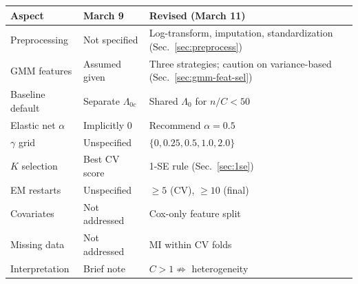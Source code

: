 \documentclass[11pt]{article}
\begin{document}
\begin{center}\small
\begin{tabular}{p{3cm}p{5cm}p{5.5cm}}
\toprule
\textbf{Aspect} & \textbf{March 9} & \textbf{Revised (March 11)} \\
\midrule
Preprocessing & Not specified & Log-transform, imputation, standardization (Sec.~\ref{sec:preprocess}) \\[3pt]
GMM features & Assumed given & Three strategies; caution on variance-based (Sec.~\ref{sec:gmm-feat-sel}) \\[3pt]
Baseline default & Separate $\Lambda_{0c}$ & Shared $\Lambda_0$ for $n/C<50$ \\[3pt]
Elastic net $\alpha$ & Implicitly 0 & Recommend $\alpha=0.5$ \\[3pt]
$\gamma$ grid & Unspecified & $\{0, 0.25, 0.5, 1.0, 2.0\}$ \\[3pt]
$K$ selection & Best CV score & 1-SE rule (Sec.~\ref{sec:1se}) \\[3pt]
EM restarts & Unspecified & $\ge 5$ (CV), $\ge 10$ (final) \\[3pt]
Covariates & Not addressed & Cox-only feature split \\[3pt]
Missing data & Not addressed & MI within CV folds \\[3pt]
Interpretation & Brief note & $C>1 \not\Rightarrow$ heterogeneity \\
\bottomrule
\end{tabular}
\end{center}
\end{document}

